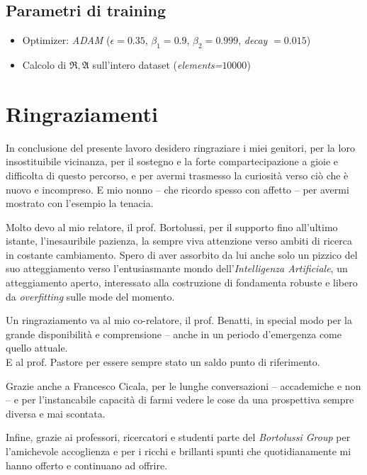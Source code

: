 \documentclass[a4paper, twoside]{article}
\begin{document}
\subsection{Parametri di training}
\begin{itemize}
	\item {Optimizer: \textit{ADAM} ($\epsilon=0.35$,  $\beta_1=0.9$, $\beta_2=0.999$, \textit{decay} $=0.015$)}
	\item {Calcolo di $\mathfrak{R}, \mathfrak{A}$ sull'intero dataset (\textit{elements=$10000$})}
\end{itemize}




\newpage

\section*{Ringraziamenti}

In conclusione del presente lavoro desidero ringraziare i miei genitori, per la loro insostituibile vicinanza, per il sostegno e la forte compartecipazione a gioie e difficolta di questo percorso, e per avermi trasmesso la curiosità verso ciò che è nuovo e incompreso. E mio nonno -- che ricordo spesso con affetto -- per avermi mostrato con l'esempio la tenacia.

Molto devo al mio relatore, il prof. Bortolussi, per il supporto fino all'ultimo istante, l'inesauribile pazienza, la sempre viva attenzione verso ambiti di ricerca in costante cambiamento. Spero di aver assorbito da lui anche solo un pizzico del suo atteggiamento verso l'entusiasmante mondo dell'\textit{Intelligenza Artificiale}, un atteggiamento aperto, interessato alla costruzione di fondamenta robuste e libero da \textit{overfitting} sulle mode del momento.

Un ringraziamento va al mio co-relatore, il prof. Benatti, in special modo per la grande disponibilità e comprensione -- anche in un periodo d'emergenza come quello attuale.\\
E al prof. Pastore per essere sempre stato un saldo punto di riferimento.

Grazie anche a Francesco Cicala, per le lunghe conversazioni -- accademiche e non -- e per l'instancabile capacità di farmi vedere le cose da una prospettiva sempre diversa e mai scontata.

Infine, grazie ai professori, ricercatori e studenti parte del \textit{Bortolussi Group} per l'amichevole accoglienza e per i ricchi e brillanti spunti che quotidianamente mi hanno offerto e continuano ad offrire.
\end{document}
